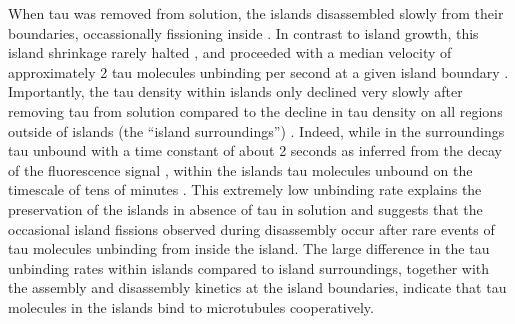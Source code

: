When tau was removed from solution, the islands disassembled slowly from their boundaries, occassionally fissioning inside . In contrast to island growth, this island shrinkage rarely halted , and proceeded with a median velocity of approximately 2 tau molecules unbinding per second at a given island boundary . Importantly, the tau density within islands only declined very slowly after removing tau from solution compared to the decline in tau density on all regions outside of islands (the “island surroundings”) . Indeed, while in the surroundings tau unbound with a time constant of about 2 seconds as inferred from the decay of the fluorescence signal , within the islands tau molecules unbound on the timescale of tens of minutes . This extremely low unbinding rate explains the preservation of the islands in absence of tau in solution and suggests that the occasional island fissions observed during disassembly occur after rare events of tau molecules unbinding from inside the island. The large difference in the tau unbinding rates within islands compared to island surroundings, together with the assembly and disassembly kinetics at the island boundaries, indicate that tau molecules in the islands bind to microtubules cooperatively. 

